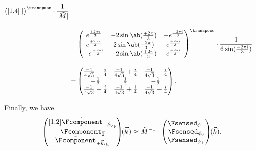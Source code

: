 \begin{equation*}
\begin{split}
\begin{pmatrix}[1.4]
\begin{smallmatrix}
            \end{smallmatrix}|
        \end{pmatrix}^{\transpose} \cdot \frac{1}{|\tilde{M}|}\\[1em]
        &= \begin{pmatrix}
            e^{\frac{+2\pi i}{3}}  & -2\sin\ab(\frac{+2\pi}{3}) & -e^{\frac{-2\pi i}{3}} \\
            e^{\frac{+2\pi i}{3}}  & 2\sin\ab(\frac{+2\pi}{3})   & e^{\frac{+2\pi i}{3}} \\
            -e^{\frac{-2\pi i}{3}} & -2\sin\ab(\frac{+2\pi}{3}) & e^{\frac{+2\pi i}{3}}
        \end{pmatrix}^{\transpose} \cdot \frac{1}{6\sin(\frac{-2\pi i}{3})}  \\[1em]
        &= \begin{pmatrix}
            \frac{-1}{4 \sqrt{3}} + \frac{i}{4} & \frac{-1}{4 \sqrt{3}} + \frac{i}{4} & \frac{-1}{4 \sqrt{3}}
            - \frac{i}{4}\\
            -\frac{1}{2} & \frac{1}{2} & -\frac{1}{2} \\
            \frac{-1}{4 \sqrt{3}} - \frac{i}{4} & \frac{-1}{4 \sqrt{3}} + \frac{i}{4} & \frac{-1}{4 \sqrt{3}}
            + \frac{i}{4}
        \end{pmatrix}.
        \end{split} 
    \end{equation*}

Finally, we have 
    \begin{equation}
        \begin{pmatrix}[1.2]
            \tilde{\Fcomponent}_{-\vec{k}_\ip} \\
            \Fcomponent_{\vec{0}} \\
            \tilde{\Fcomponent}_{+\vec{k}_\ip} \\
        \end{pmatrix}\hspace{-0.3em}(\vec{k}) \approx \tilde{M}^{-1} \cdot 
        \begin{pmatrix}
        \Fsensed_{\phi_{-}} \\ 
        \Fsensed_{\phi_0} \\
        \Fsensed_{\phi_{+}}
        \end{pmatrix}\hspace{-0.3em}(\vec{k}).
    \end{equation}

